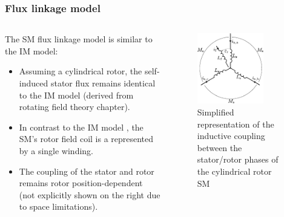 \begin{frame}
	\frametitle{Flux linkage model}
    \begin{columns}
		\begin{column}{0.55\textwidth}
			The SM flux linkage model is similar to the IM model:
	       \begin{itemize}
            \item<2-> Assuming a cylindrical rotor, the self-induced stator flux remains identical to the IM model (derived from rotating field theory chapter).
            \item<3-> In contrast to the IM model , the SM's rotor field coil is a represented by a single winding. 
            \item<4-> The coupling of the stator and rotor remains rotor position-dependent (not explicitly shown on the right due to space limitations). 
           \end{itemize}
        \end{column}
        \begin{column}{0.45\textwidth}
                \begin{figure}
                    \centering
                    \includegraphics[width=0.75\textwidth]{fig/lec07/Inductive_coupling_stator_rotor.pdf}
                    \caption{Simplified representation of the inductive coupling between the stator/rotor phases of the cylindrical rotor SM}
                    \label{fig:Inductive_coupling_stator_rotor_SM}
                \end{figure}
        \end{column}
    \end{columns}
\end{frame}

